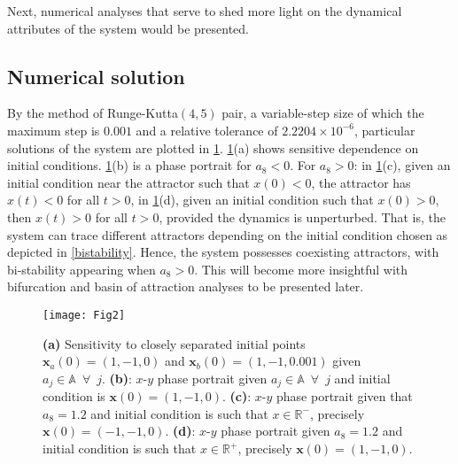 \documentclass[final,5p,times,twocolumn]{elsarticle}
\begin{document}
Next, numerical analyses that serve to shed more light on the dynamical attributes of the system would be presented.

\subsection{Numerical solution}
By the method of Runge-Kutta$(4,5)$ pair, a variable-step size of which the maximum step is $0.001$ and a relative tolerance of $2.2204\times10^{-6}$, particular solutions of the system are plotted in \cref{solution1}. \cref{solution1}{(a)} shows sensitive dependence on initial conditions. \cref{solution1}{(b)} is a phase portrait for $a_8<0$. For $a_8>0$: in \cref{solution1}{(c)}, given an initial condition near the attractor such that $x(0)<0$, the attractor has $x(t)<0$ for all $t>0$, in \cref{solution1}{(d)}, given an initial condition such that $x(0)>0$, then $x(t)>0$ for all $t>0$, provided the dynamics is unperturbed. %
That is, the system can trace different attractors depending on the initial condition chosen as depicted in \cref{bistability}. Hence, the system possesses coexisting attractors, with bi-stability appearing when $a_8>0$. This will become more insightful with bifurcation and basin of attraction analyses to be presented later.
\begin{figure}[htbp]
	\texttt{[image: Fig2]}
	\caption{\textbf{(a)} Sensitivity to closely separated initial points $\bm{x}_a(0)=(1,-1,0)$ and $\bm{x}_b(0)=(1,-1,0.001)$ given $a_j\in\mathbb{A}\enspace\forall\enspace j$. \textbf{(b)}: $x$-$y$ phase portrait given $a_j\in\mathbb{A}\enspace\forall\enspace j$ and initial condition is $\bm{x}(0)=(1,-1,0)$. \textbf{(c)}: $x$-$y$ phase portrait given that $a_8 = 1.2$ and initial condition is such that $x\in\mathbb{R}^{-}$, precisely $\bm{x}(0)=(-1,-1,0)$. \textbf{(d)}: $x$-$y$ phase portrait given $a_8=1.2$ and initial condition is such that $x\in\mathbb{R}^{+}$, precisely $\bm{x}(0)=(1,-1,0)$.}
	\label{solution1}		
\end{figure}			
\end{document}
